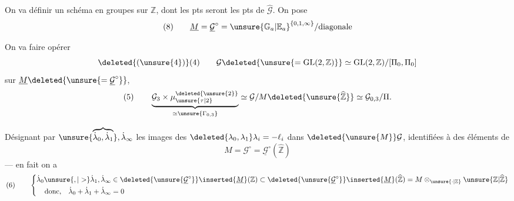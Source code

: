 On va définir un schéma en groupes  sur $\mathbb{Z}$, dont les pts seront  les pts de $\widehat{\mathcal{G}}$. On pose
\[
(8)\qquad
\underline{M}=\underline{\mathcal{G}}^{\circ}
=\unsure{\mathbb{G}_a|\mathbb{E}_a}^{\{0,1,\infty\}}/\text{diagonale}
\]

On va faire opérer 
\[
\deleted{(\unsure{4})}(4)\qquad
\mathcal{G}\deleted{\unsure{=\operatorname{GL}(2,\mathbb{Z})}}
\simeq\operatorname{GL}(2,\mathbb{Z})/[\Pi_0,\Pi_0]
\]
sur $\underline{M}\deleted{\unsure{=\underline{\mathcal{G}}^{\circ}}}$,
 
\[
(5)\qquad
\underbrace{\mathcal{G}_3\times\mu_{\unsure{\tau|2}}^{\deleted{\unsure{2}}}}_{\simeq\unsure{\Gamma_{0,3}}}
\simeq\mathcal{G}/M\deleted{\unsure{\widehat{\mathbb{Z}}}}
\simeq\mathcal{G}_{0,3}/\Pi.
\]

Désignant par $\unsure{\overbrace{\dot{\lambda}_0,\dot{\lambda}_1}},\dot{\lambda}_\infty$ les images des
$\deleted{\lambda_0,\lambda_1}\lambda_i=-\ell_i$ dans $\deleted{\unsure{M}}\mathcal{G}$, identifiées à des éléments de
\[
M=\mathcal{G}^{\circ}=\underline{\mathcal{G}}^{\circ}(\widehat{\mathbb{Z}})
\]
--- en fait on a
\[
(6)\qquad
\left\{
\begin{aligned}
\dot{\lambda}_0\unsure{,|>}\dot{\lambda}_1,\dot{\lambda}_\infty
&\in\deleted{\unsure{\underline{\mathcal{G}}^{\circ}}}\inserted{\underline{M}}(\mathbb{Z})
\subset\deleted{\unsure{\underline{\mathcal{G}}^{\circ}}}\inserted{\underline{M}}(\widehat{\mathbb{Z}})
=M\otimes_{\unsure{\cdot|\mathbb{Z}}}\unsure{\mathbb{Z}|\widehat{\mathbb{Z}}}\\
\text{donc,}\quad\dot{\lambda}_0+\dot{\lambda}_1+\dot{\lambda}_\infty&=0
\end{aligned}\right.
\]

